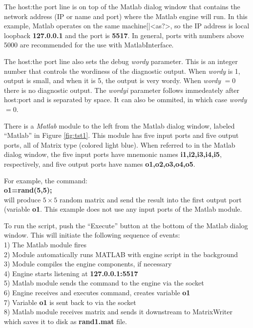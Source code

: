 The host:the port line is on top of the Matlab dialog window that contains the network address (IP or name and port) where the Matlab 
engine will run. In this example, Matlab operates on the same
machine[|<as?>, so the IP address is local loopback {\bf 127.0.0.1} and 
the port is {\bf 5517}. In general, ports with numbers above 5000
are recommended for the use with MatlabInterface. 

The host:the port line also sets the debug {\it wordy} parameter.
This is an integer number that controls the wordiness
of the diagnostic output. When {\it wordy} is 1, output is small, and
when it is 5, the output is very wordy. When {\it wordy} $=0$ there
is no diagnostic output. The {\it wordyi} parameter follows immedeately after
host:port and is separated by space. It can also be ommited, in which
case {\it wordy} $=0$.

There is a {\it Matlab} module to the left from the Matlab dialog window,
labeled ``Matlab'' in Figure \ref{fig:tst1}. This module has five input
ports and five output ports, all of Matrix type (colored light blue). 
When referred to in the Matlab dialog window, the five input ports have mnemonic 
names {\bf i1,i2,i3,i4,i5}, respectively, and five output ports have
names {\bf o1,o2,o3,o4,o5}. 

For example, the command: \\
{\bf o1=rand(5,5);} \\
will produce $5 \times 5$ random matrix and send the result
into the first output port (variable {\bf o1}. This example does
not use any input ports of the Matlab module.

To run the script, push the ``Execute'' button at the bottom of the
Matlab dialog window. This will initiate the following
sequence of events: \\
1) The Matlab module fires \\
2) Module automatically runs MATLAB with engine script in the background  \\
3) Module compiles the engine components, if necessary \\
4) Engine starts listening at {\bf 127.0.0.1:5517} \\
5) Matlab module sends the command to the engine via the socket\\
6) Engine receives and executes command, creates variable {\bf o1} \\
7) Variable {\bf o1} is sent back to \sr{} via the socket \\
8) \sr{} Matlab module receives matrix and sends it downstream
   to MatrixWriter which saves it to disk as {\bf rand1.mat} file. \\

